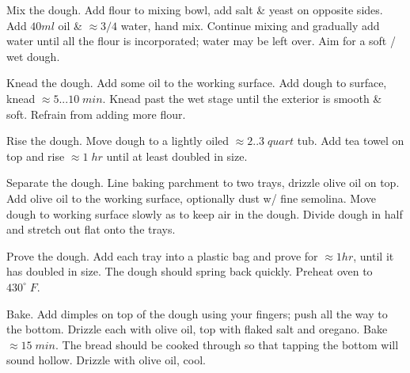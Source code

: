 \begin{preparation}
\item Mix the dough.
Add flour to mixing bowl, add salt \& yeast on opposite sides.
Add $40ml$ oil \& $\approx 3/4$ water, hand mix.
Continue mixing and gradually add water until all the flour is incorporated; water may be left over.
Aim for a soft / wet dough.

\item Knead the dough.
Add some oil to the working surface.
Add dough to surface, knead $\approx 5...10\;min$.
Knead past the wet stage until the exterior is smooth \& soft.
Refrain from adding more flour.

\item Rise the dough.
Move dough to a lightly oiled $\approx 2..3\; quart$ tub.
Add tea towel on top and rise $\approx 1\;hr$ until at least doubled in size.

\item Separate the dough.
Line baking parchment to two trays, drizzle olive oil on top.
Add olive oil to the working surface, optionally dust w/ fine semolina.
Move dough to working surface slowly as to keep air in the dough.
Divide dough in half and stretch out flat onto the trays.

\item Prove the dough.
Add each tray into a plastic bag and prove for $\approx 1 hr$, until it has doubled in size.
The dough should spring back quickly.
Preheat oven to $430^\circ \; F$.

\item Bake.
Add dimples on top of the dough using your fingers; push all the way to the bottom.
Drizzle each with olive oil, top with flaked salt and oregano.
Bake $\approx 15 \; min$.
The bread should be cooked through so that tapping the bottom will sound hollow.
Drizzle with olive oil, cool.

\end{preparation}

\recipeend
